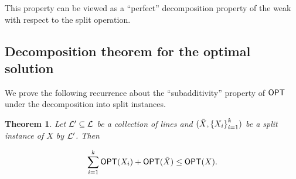 \documentclass[11pt]{article}
\numberwithin{equation}{section}
\newtheorem{theorem}{Theorem}[section]
\theoremstyle{definition}
\theoremstyle{plain}
\begin{document}
This property can be viewed as a ``perfect'' decomposition property of the weak \WBone with respect to the split operation. 
%







\subsection{Decomposition theorem for the optimal solution}
\label{sec:decompose opt}  

We prove the following recurrence about the ``subadditivity'' property of $\mbox{\sf OPT}$ under the decomposition into split instances. 
%

\begin{theorem}
        \label{thm: opt decomposes} 
Let ${\mathcal L}' \subseteq {\mathcal L}$ be a collection of lines and $(\tilde{X}, \left\{ X_i \right\}_{i=1}^k)$ be a split instance of $X$ by ${\mathcal L}'$. Then 
%
        
         $$\sum_{i =1}^k\mbox{\sf OPT}(X_i) + \mbox{\sf OPT}(\tilde{X}) \leq \mbox{\sf OPT}(X).$$
\end{theorem}
\end{document}
